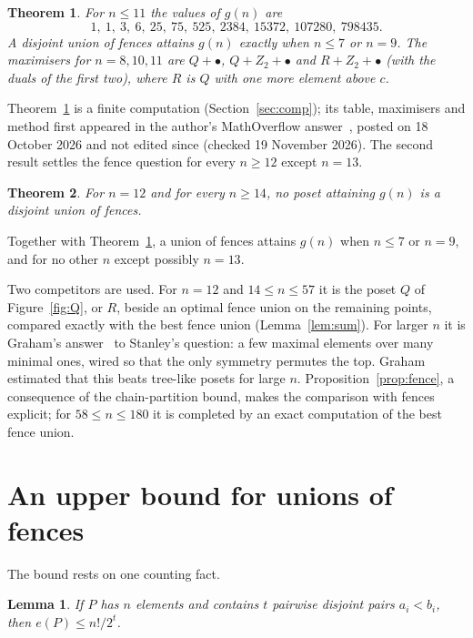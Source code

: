 \documentclass[11pt]{amsart}
\newtheorem{theorem}{Theorem}
\newtheorem{lemma}{Lemma}
\theoremstyle{remark}
\begin{document}
\begin{theorem}\label{thm:small}
For $n\le11$ the values of $g(n)$ are
\[
1,\ 1,\ 3,\ 6,\ 25,\ 75,\ 525,\ 2384,\ 15372,\ 107280,\ 798435 .
\]
A disjoint union of fences attains $g(n)$ exactly when $n\le7$ or $n=9$. The maximisers for $n=8,10,11$ are $Q+\bullet$, $Q+Z_2+\bullet$ and $R+Z_2+\bullet$ (with the duals of the first two), where $R$ is $Q$ with one more element above $c$.
\end{theorem}

Theorem~\ref{thm:small} is a finite computation (Section~\ref{sec:comp}); its table, maximisers and method first appeared in the author's MathOverflow answer~\cite{Ans}, posted on 18 October 2026 and not edited since (checked 19 November 2026). The second result settles the fence question for every $n\ge12$ except $n=13$.

\begin{theorem}\label{thm:large}
For $n=12$ and for every $n\ge14$, no poset attaining $g(n)$ is a disjoint union of fences.
\end{theorem}

Together with Theorem~\ref{thm:small}, a union of fences attains $g(n)$ when $n\le7$ or $n=9$, and for no other $n$ except possibly $n=13$.

Two competitors are used. For $n=12$ and $14\le n\le57$ it is the poset $Q$ of Figure~\ref{fig:Q}, or $R$, beside an optimal fence union on the remaining points, compared exactly with the best fence union (Lemma~\ref{lem:sum}). For larger $n$ it is Graham's answer~\cite{Gr} to Stanley's question: a few maximal elements over many minimal ones, wired so that the only symmetry permutes the top. Graham estimated that this beats tree-like posets for large $n$. Proposition~\ref{prop:fence}, a consequence of the chain-partition bound, makes the comparison with fences explicit; for $58\le n\le180$ it is completed by an exact computation of the best fence union.

\section{An upper bound for unions of fences}

The bound rests on one counting fact.

\begin{lemma}\label{lem:pairs}
If $P$ has $n$ elements and contains $t$ pairwise disjoint pairs $a_i<b_i$, then $e(P)\le n!/2^t$.
\end{lemma}
\end{document}
